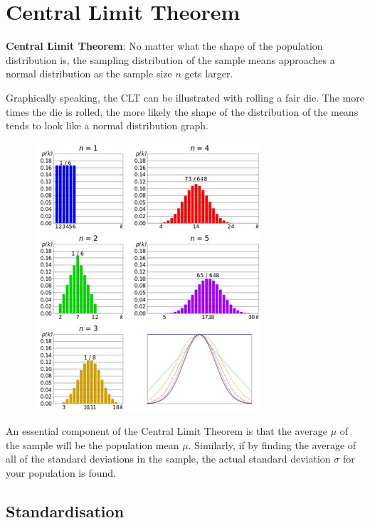 \documentclass[10pt,a4paper]{article}
\begin{document}
\pagebreak
\section{Central Limit Theorem}

\begin{tcolorbox}[breakable,colback=white]
\textbf{Central Limit Theorem}: No matter what the shape of the population distribution is, the
sampling distribution of the sample means approaches a normal distribution as the sample size $n$ gets
larger.
\end{tcolorbox}
 
Graphically speaking, the CLT can be illustrated with rolling a fair die. The more times the die is
rolled, the more likely the shape of the distribution of the means tends to look like a normal
distribution graph.

\begin{figure} [h!]
	\centering
	\includegraphics[]{CLT.JPG}
\end{figure}

An essential component of the Central Limit Theorem is that the average $\mu$ of the sample will be
the population mean $\mu$. Similarly, if by finding the average of all of the standard deviations in
the sample, the actual standard deviation $\sigma$ for your population is found.


\subsection{Standardisation}
\end{document}
